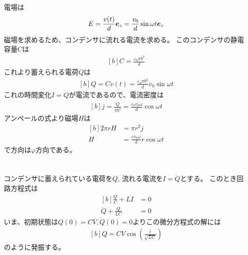 \documentclass[../ap_2014.tex]{subfiles}
\begin{document}
\section{}
電場は
\begin{equation}\begin{aligned}[b]
    E = \frac{v(t)}{d}\vb*{e}_z = \frac{v_0}{d}\sin\omega t \vb*{e}_z
\end{aligned}\end{equation}
磁場を求めるため、コンデンサに流れる電流を求める。
このコンデンサの静電容量\(C\)は
\begin{equation}\begin{aligned}[b]
    C = \frac{\varepsilon_0 \pi b^2}{d}
\end{aligned}\end{equation}
これより蓄えられる電荷\(Q\)は
\begin{equation}\begin{aligned}[b]
    Q = Cv(t) = \frac{\varepsilon_0 \pi b^2}{d}v_0\sin\omega t
\end{aligned}\end{equation}
これの時間変化\(I=\dot{Q}\)が電流であるので、電流密度は
\begin{equation}\begin{aligned}[b]
    j = \frac{\dot{Q}}{\pi b^2} = \frac{\varepsilon_0 v_0\omega}{d}\cos\omega t
\end{aligned}\end{equation}
アンペールの式より磁場\(H\)は
\begin{equation}\begin{aligned}[b]
    2\pi r H &=\pi r^2 j\\
    H &= \frac{\varepsilon v_0 \omega}{d}r\cos\omega t
\end{aligned}\end{equation}
で方向は\(\varphi\)方向である。

\section{}
\subsection{}
コンデンサに蓄えられている電荷を\(Q\),
流れる電流を\(I=\dot{Q}\)とする。
このとき回路方程式は
\begin{equation}\begin{aligned}[b]
    \frac{Q}{C}+L\dot{I}&=0\\
    \ddot{Q}+\frac{Q}{LC} &=0
\end{aligned}\end{equation}
いま、初期状態は\(Q(0)=CV,\dot{Q}(0)=0\)よりこの微分方程式の解には
\begin{equation}\begin{aligned}[b]
    Q = CV\cos(\frac{t}{\sqrt{LC}})
\end{aligned}\end{equation}
のように発振する。
\end{document}
